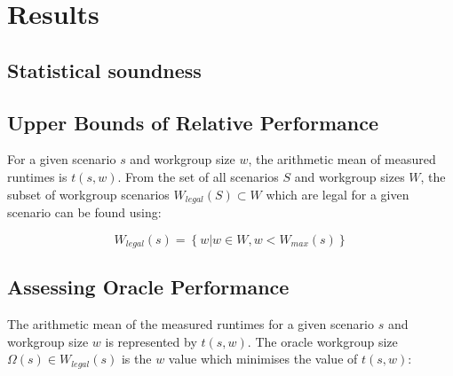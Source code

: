 

\section{Results}

\subsection{Statistical soundness}


\subsection{Upper Bounds of Relative Performance}


For a given scenario $s$ and workgroup size $w$, the arithmetic mean
of measured runtimes is $t(s,w)$. From the set of all scenarios $S$
and workgroup sizes $W$, the subset of workgroup scenarios
$W_{legal}(S) \subset W$ which are legal for a given scenario can be
found using:

\begin{equation}
W_{legal}(s) = \left\{w | w \in W, w < W_{max}(s) \right\}
\end{equation}

\subsection{Assessing Oracle Performance}

The arithmetic mean of the measured runtimes for a given scenario $s$
and workgroup size $w$ is represented by $t(s,w)$. The oracle
workgroup size $\Omega(s) \in W_{legal}(s)$ is the $w$ value which
minimises the value of $t(s,w)$:

